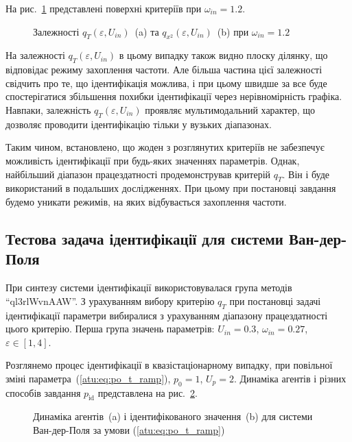 На рис.~\ref{atu:f:vdp_q2_120} представлені поверхні критеріїв при
$\omega_{in} = 1.2$.

\begin{figure}[ht!]
  \caption{Залежності $q_T(\varepsilon,U_{in})$~(a) та $q_{x^2}(\varepsilon,U_{in})$~(b)  при $\omega_{in}=1.2$}
\label{atu:f:vdp_q2_120}
\end{figure}

На залежності
$q_T(\varepsilon, U_{in}) $ в цьому випадку також видно плоску ділянку,
що відповідає режиму захоплення частоти. Але більша частина
цієї залежності свідчить про те, що ідентифікація можлива,
і при цьому швидше за все буде спостерігатися збільшення
похибки ідентифікації через нерівномірність графіка. Навпаки,
залежність
$q_T (\varepsilon, U_{in})$ проявляє мультимодальний характер, що дозволяє
проводити ідентифікацію тільки у вузьких діапазонах.

Таким чином, встановлено, що жоден з розглянутих критеріїв не
забезпечує можливість ідентифікації при будь-яких значеннях
параметрів. Однак, найбільший діапазон працездатності
продемонстрував критерій
$q_{T}$. Він і буде використаний в подальших дослідженнях. При
цьому при постановці завдання будемо уникати режимів, на яких
відбувається захоплення частоти.


\subsection{Тестова задача ідентифікації для системи Ван-дер-Поля} %

При синтезу системи ідентифікації використовувалася група
методів ``ql3rlWvnAAW''. З урахуванням вибору критерію
$q_{T}$ при постановці задачі ідентифікації параметри
вибиралися з урахуванням діапазону працездатності цього
критерію. Перша група значень параметрів:
$U_{in} = 0.3$,
$\omega_{in} = 0.27$,
$\varepsilon \in [1, 4]$.

Розглянемо процес ідентифікації в квазістаціонарному випадку,
при повільної зміні параметра~(\ref{atu:eq:po_t_ramp}),
$p_0 = 1$,
$U_p = 2$. Динаміка агентів і різних способів завдання
$p_\mathrm{id} $ представлена на рис.~\ref{atu:f:vdp_id1_ramp}.

\begin{figure}[ht!]
  \caption{Динаміка агентів~(a) і ідентифікованого значення~(b) для системи Ван-дер-Поля за умови (\ref{atu:eq:po_t_ramp})}
\label{atu:f:vdp_id1_ramp}
\end{figure}

